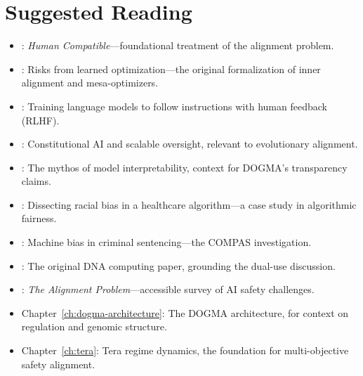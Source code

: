 \section*{Suggested Reading}
\begin{itemize}[leftmargin=1.5em]
  \item \citet{russell2019}: \emph{Human Compatible}---foundational treatment of the alignment problem.
  \item \citet{hubinger2019}: Risks from learned optimization---the original formalization of inner alignment and mesa-optimizers.
  \item \citet{ouyang2022}: Training language models to follow instructions with human feedback (RLHF).
  \item \citet{bai2022}: Constitutional AI and scalable oversight, relevant to evolutionary alignment.
  \item \citet{lipton2018}: The mythos of model interpretability, context for DOGMA's transparency claims.
  \item \citet{obermeyer2019}: Dissecting racial bias in a healthcare algorithm---a case study in algorithmic fairness.
  \item \citet{angwin2016}: Machine bias in criminal sentencing---the COMPAS investigation.
  \item \citet{adleman1994}: The original DNA computing paper, grounding the dual-use discussion.
  \item \citet{christian2020}: \emph{The Alignment Problem}---accessible survey of AI safety challenges.
  \item Chapter~\ref{ch:dogma-architecture}: The DOGMA architecture, for context on regulation and genomic structure.
  \item Chapter~\ref{ch:tera}: Tera regime dynamics, the foundation for multi-objective safety alignment.
\end{itemize}
